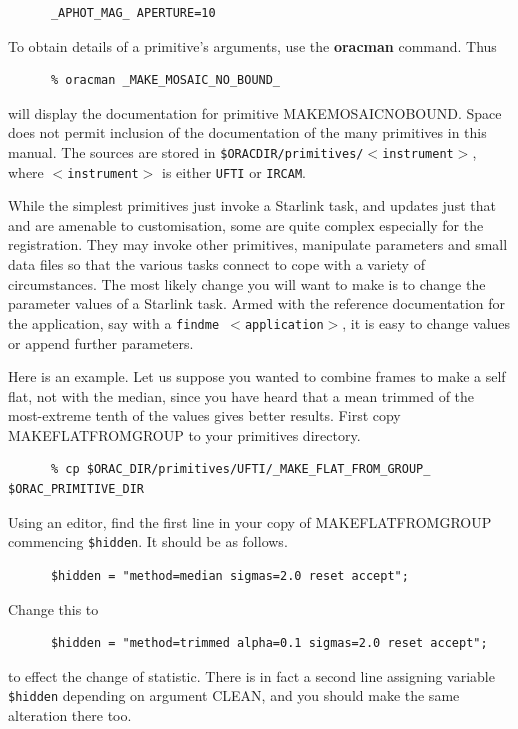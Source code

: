 \documentclass[twoside,11pt]{article}
\renewcommand{\_}{\texttt{\symbol{95}}}
\begin{document}
\begin{verbatim}
      _APHOT_MAG_ APERTURE=10
\end{verbatim}

To obtain details of a primitive's arguments, use the {\bf oracman}
command.  Thus

\begin{verbatim}
      % oracman _MAKE_MOSAIC_NO_BOUND_
\end{verbatim}
will display the documentation for primitive
\_MAKE\_MOSAIC\_NO\_BOUND\_.  Space does not permit inclusion of the
documentation of the many primitives in this manual.  The sources are
stored in {\tt \$ORAC\_DIR/primitives/$<$instrument$>$}, where
{\tt$<$instrument$>$} is either {\tt UFTI} or {\tt IRCAM}.

While the simplest primitives just invoke a Starlink task, and updates
just that and are amenable to customisation, some are quite complex
especially for the registration.  They may invoke other primitives,
manipulate parameters and small data files so that the various tasks
connect to cope with a variety of circumstances.  The most likely
change you will want to make is to change the parameter values of a
Starlink task.  Armed with the reference documentation for the
application, say with a {\tt findme $<$application$>$}, it is easy
to change values or append further parameters.  

Here is an example.  Let us suppose you wanted to combine frames to
make a self flat, not with the median, since you have heard that a mean
trimmed of the most-extreme tenth of the values gives better results.
First copy \_MAKE\_FLAT\_FROM\_GROUP\_ to your primitives directory.

\begin{verbatim}
      % cp $ORAC_DIR/primitives/UFTI/_MAKE_FLAT_FROM_GROUP_ $ORAC_PRIMITIVE_DIR
\end{verbatim}
Using an editor, find the first line in your copy of
\_MAKE\_FLAT\_FROM\_GROUP\_ commencing {\tt \$hidden}.  It should be
as follows.

\begin{verbatim}
      $hidden = "method=median sigmas=2.0 reset accept"; 
\end{verbatim}
Change this to

\begin{verbatim}
      $hidden = "method=trimmed alpha=0.1 sigmas=2.0 reset accept"; 
\end{verbatim}
to effect the change of statistic.  There is in fact a second line
assigning variable {\tt \$hidden} depending on argument CLEAN, and you
should make the same alteration there too.
\end{document}

